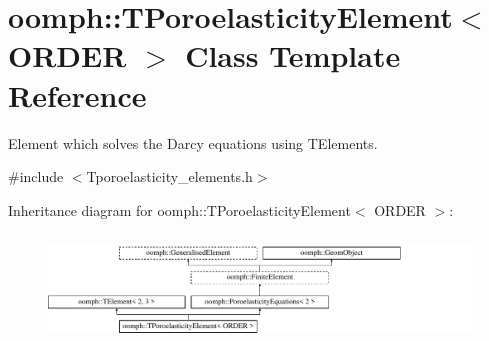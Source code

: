 \hypertarget{classoomph_1_1TPoroelasticityElement}{}\section{oomph\+:\+:T\+Poroelasticity\+Element$<$ O\+R\+D\+ER $>$ Class Template Reference}
\label{classoomph_1_1TPoroelasticityElement}


Element which solves the Darcy equations using T\+Elements.  




{\ttfamily \#include $<$Tporoelasticity\+\_\+elements.\+h$>$}

Inheritance diagram for oomph\+:\+:T\+Poroelasticity\+Element$<$ O\+R\+D\+ER $>$\+:\begin{figure}[H]
\begin{center}
\leavevmode
\includegraphics[height=2.905318cm]{classoomph_1_1TPoroelasticityElement}
\end{center}
\end{figure}
